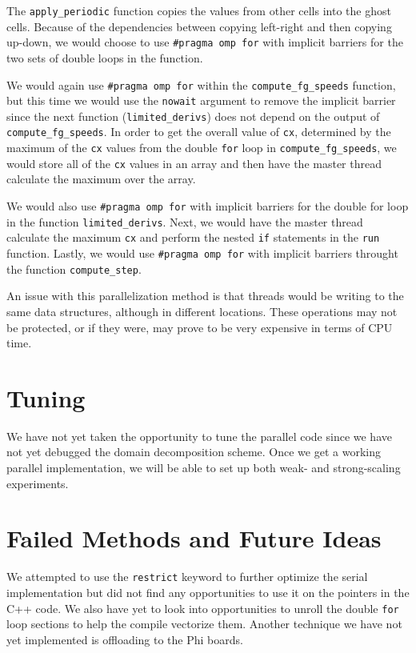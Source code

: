 \documentclass[12pt]{article}
\begin{document}
The \texttt{apply\_periodic} function copies the values from other cells into the ghost cells.
Because of the dependencies between copying left-right and then copying up-down, we would choose to use \texttt{\#pragma omp for} with implicit barriers for the two sets of double  loops in the function.

We would again use \texttt{\#pragma omp for} within the \texttt{compute\_fg\_speeds} function, but this time we would use the \texttt{nowait} argument to remove the implicit barrier since the next function (\texttt{limited\_derivs}) does not depend on the output of \texttt{compute\_fg\_speeds}.
In order to get the overall value of \texttt{cx}, determined by the maximum of the \texttt{cx} values from the double \texttt{for} loop in \texttt{compute\_fg\_speeds}, we would store all of the \texttt{cx} values in an array and then have the master thread calculate the maximum over the array.

We would also use \texttt{\#pragma omp for} with implicit barriers for the double for loop in the function \texttt{limited\_derivs}.
Next, we would have the master thread calculate the maximum \texttt{cx} and perform the nested \texttt{if} statements in the \texttt{run} function.
Lastly, we would use \texttt{\#pragma omp for} with implicit barriers throught the function \texttt{compute\_step}.

An issue with this parallelization method is that threads would be writing to the same data structures, although in different locations.
These operations may not be protected, or if they were, may prove to be very expensive in terms of CPU time.

\section{Tuning}
We have not yet taken the opportunity to tune the parallel code since we have not yet debugged the domain decomposition scheme.
Once we get a working parallel implementation, we will be able to set up both weak- and strong-scaling experiments.

\section{Failed Methods and Future Ideas}
We attempted to use the \texttt{restrict} keyword to further optimize the serial implementation but did not find any opportunities to use it on the pointers in the C++ code.
We also have yet to look into opportunities to unroll the double \texttt{for} loop sections to help the compile vectorize them.
Another technique we have not yet implemented is offloading to the Phi boards.

%
\end{document}
